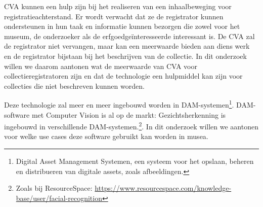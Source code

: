 CVA kunnen een hulp zijn bij het realiseren van een inhaalbeweging voor registratieachterstand. Er wordt verwacht dat ze de registrator kunnen ondersteunen in hun taak en informatie kunnen bezorgen die zowel voor het museum, de onderzoeker als de erfgoedge{\"i}nteresseerde interessant is. De CVA zal de registrator niet vervangen, maar kan een meerwaarde bieden aan diens werk en de registrator bijstaan bij het beschrijven van de collectie. In dit onderzoek willen we daarom aantonen wat de meerwaarde van CVA voor collectieregistratoren zijn en dat de technologie een hulpmiddel kan zijn voor collecties die niet beschreven kunnen worden.

Deze technologie zal meer en meer ingebouwd worden in DAM-systemen\footnote{Digital Asset Management Systemen, een systeem voor het opslaan, beheren en distribueren van digitale assets, zoals afbeeldingen.}. DAM-software met Computer Vision is al op de markt: Gezichtsherkenning is ingebouwd in verschillende DAM-systemen.\footnote{Zoals bij ResourceSpace: \url{https://www.resourcespace.com/knowledge-base/user/facial-recognition}}. In dit onderzoek willen we aantonen voor welke use cases deze software gebruikt kan worden in musea.